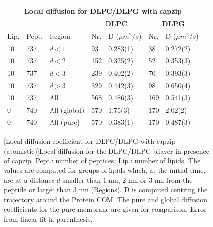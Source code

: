 %
\begin{figure}[p!]
\centering
 \def\arraystretch{1.6}
\begin{tabular}{lllllll}
\multicolumn{7}{c}{\textbf{Local diffusion for DLPC/DLPG with capzip}} \\
\hline
& & & \multicolumn{2}{c}{\textbf{DLPC}} & \multicolumn{2}{c}{\textbf{DLPG}} \\
 \hline
Lip. & Pept. & Region & Nr. & D ($\mu m^2/s$) & Nr. & D ($\mu m^2/s$) \\
 \hline
10 & 737 & $d<1$ & 93 & 0.283(1) & 38 & 0.272(2)  \\
10 & 737 & $d<2$ & 152 & 0.325(2) & 52 & 0.353(3) \\
10 & 737 & $d<3$ & 239 & 0.402(2) & 70 & 0.393(3) \\
10 & 737 & $d>3$ & 329 & 0.442(3) & 98 & 0.650(4) \\
10 & 737 & All & 568 & 0.486(3) & 169 & 0.541(3) \\
 \hline
0 & 740 & All (global) & 570 & 1.75(3) & 170 & 2.02(2) \\
0 & 740 & All (pure) & 570 & 0.383(1) & 170 & 0.487(3) \\
 \hline
 \end{tabular}
[Local diffusion coefficient for DLPC/DLPG with capzip (atomistic)]{Local diffusion for the DLPC/DLPC bilayer in presence of capzip. 
%
Pept.: number of peptides; Lip.: number of lipids.
%
The values are computed for groups of lipids which, at the initial time, are at a distance $d$ smaller than 1 nm, 2 nm or 3 nm from the peptide or larger than 3 nm (Regions).
%
D is computed centring the trajectory around the Protein COM. The pure and global diffusion coefficients for the pure membrane are given for comparison. Error from linear fit in parenthesis.}
\label{table:D_space}

\vspace{0.5cm}


\end{figure}
